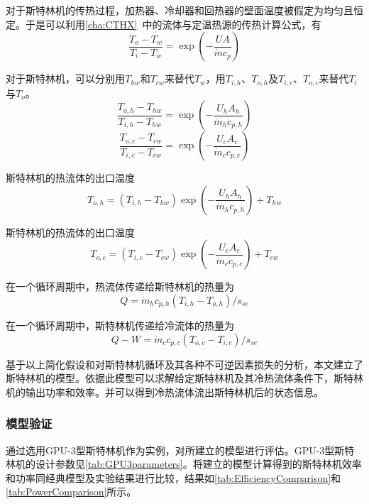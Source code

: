 对于斯特林机的传热过程，加热器、冷却器和回热器的壁面温度被假定为均匀且恒定。于是可以利用\autoref{cha:CTHX}~中的流体与定温热源的传热计算公式，有
\begin{equation}
	\frac{T_o-T_w}{T_i-T_w}=\exp(-\frac{UA}{\dot{m}c_p})
\end{equation}

对于斯特林机，可以分别用$T_{hw}$和$T_{cw}$来替代$T_w$，用$T_{i,h}$、$T_{o,h}$及$T_{i,c}$、$T_{o,c}$来替代$T_{i}$与$T_{o}$。
\begin{equation}
	\frac{T_{o,h}-T_{hw}}{T_{i,h}-T_{hw}}=\exp(-\frac{U_hA_h}{\dot{m}_hc_{p,h}})
	\label{eq:T_h}
\end{equation}
\begin{equation}
	\frac{T_{o,c}-T_{cw}}{T_{i,c}-T_{cw}}=\exp(-\frac{U_cA_c}{\dot{m}_cc_{p,c}})
	\label{eq:T_c}
\end{equation}

斯特林机的热流体的出口温度
\begin{equation}
	T_{o,h}=(T_{i,h}-T_{hw})\exp(-\frac{U_hA_h}{\dot{m}_hc_{p,h}}) + T_{hw}
	\label{eq:T_o_h}
\end{equation}

斯特林机的热流体的出口温度
\begin{equation}
	T_{o,c}=(T_{i,c}-T_{cw})\exp(-\frac{U_cA_c}{\dot{m}_cc_{p,c}}) + T_{cw}
	\label{eq:T_o_c}
\end{equation}

在一个循环周期中，热流体传递给斯特林机的热量为
\begin{equation}
	Q = \dot{m}_hc_{p,h}(T_{i,h}-T_{o,h})/s_{se}
	\label{eq:q_h}
\end{equation}

在一个循环周期中，斯特林机传递给冷流体的热量为
\begin{equation}
	 Q - W = \dot{m}_cc_{p,c}(T_{o,c}-T_{i,c})/s_{se}	\label{eq:q_c}
\end{equation}

基于以上简化假设和对斯特林机循环及其各种不可逆因素损失的分析，本文建立了斯特林机的模型。依据此模型可以求解给定斯特林机及其冷热流体条件下，斯特林机的输出功率和效率。并可以得到冷热流体流出斯特林机后的状态信息。

\subsubsection{模型验证}
\label{sec:modelValidation}

通过选用GPU-3型斯特林机作为实例，对所建立的模型进行评估。GPU-3型斯特林机的设计参数见\autoref{tab:GPU3parameters}\cite{Babaelahi2015,Martini1983}。将建立的模型计算得到的斯特林机效率和功率同经典模型及实验结果进行比较，结果如\autoref{tab:EfficiencyComparison}和\autoref{tab:PowerComparison}所示。

